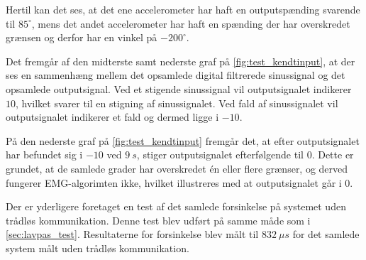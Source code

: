 Hertil kan det ses, at det ene accelerometer har haft en outputspænding svarende til $85^{\circ}$, mens det andet accelerometer har haft en spænding der har overskredet grænsen og derfor har en vinkel på $-200^{\circ}$.

Det fremgår af den midterste samt nederste graf på \autoref{fig:test_kendtinput}, at der ses en sammenhæng mellem det opsamlede digital filtrerede sinussignal og det opsamlede outputsignal. Ved et stigende sinussignal vil outputsignalet indikerer $10$, hvilket svarer til en stigning af sinussignalet. Ved fald af sinussignalet vil outputsignalet indikerer et fald og dermed ligge i $-10$.

På den nederste graf på \autoref{fig:test_kendtinput} fremgår det, at efter outputsignalet har befundet sig i $-10$ ved $9~s$, stiger outputsignalet efterfølgende til $0$. Dette er grundet, at de samlede grader har overskredet én eller flere grænser, og derved fungerer EMG-algorimten ikke, hvilket illustreres med at outputsignalet går i $0$.

Der er yderligere foretaget en test af det samlede forsinkelse på systemet uden trådløs kommunikation. Denne test blev udført på samme måde som i \autoref{sec:lavpas_test}. Resultaterne for forsinkelse blev målt til $832~\mu s$ for det samlede system målt uden trådløs kommunikation. 